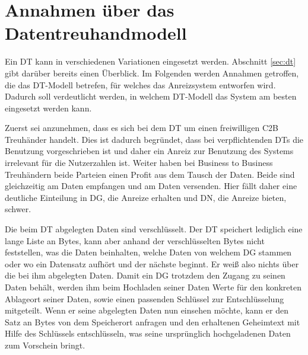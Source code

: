 \documentclass[
	fontsize=11pt,
	headings=small,
	parskip=half,           %
	bibliography=totoc,
	numbers=noenddot,       %
	open=any,               %
]{scrreprt}
\begin{document}
\section{Annahmen über das Datentreuhandmodell}
\label{sec:systemAssumptions}
Ein DT kann in verschiedenen Variationen eingesetzt werden. Abschnitt \ref{sec:dt} gibt darüber bereits einen Überblick. Im Folgenden werden Annahmen getroffen, die das DT-Modell betrefen, für welches das Anreizsystem entworfen wird. Dadurch soll verdeutlicht werden, in welchem DT-Modell das System am besten eingesetzt werden kann.

Zuerst sei anzunehmen, dass es sich bei dem DT um einen freiwilligen C2B Treuhänder handelt. Dies ist dadurch begründet, dass bei verpflichtenden DTs die Benutzung vorgeschrieben ist und daher ein Anreiz zur Benutzung des Systems irrelevant für die Nutzerzahlen ist. Weiter haben bei Business to Business Treuhändern beide Parteien einen Profit aus dem Tausch der Daten. Beide sind gleichzeitig am Daten empfangen und am Daten versenden. Hier fällt daher eine deutliche Einteilung in DG, die Anreize erhalten und DN, die Anreize bieten, schwer. 

Die beim DT abgelegten Daten sind verschlüsselt. Der DT speichert lediglich eine lange Liste an Bytes, kann aber anhand der verschlüsselten Bytes nicht feststellen, was die Daten beinhalten, welche Daten von welchem DG stammen oder wo ein Datensatz aufhört und der nächste beginnt. Er weiß also nichts über die bei ihm abgelegten Daten. Damit ein DG trotzdem den Zugang zu seinen Daten behält, werden ihm beim Hochladen seiner Daten Werte für den konkreten Ablageort seiner Daten, sowie einen passenden Schlüssel zur Entschlüsselung mitgeteilt. Wenn er seine abgelegten Daten nun einsehen möchte, kann er den Satz an Bytes von dem Speicherort anfragen und den erhaltenen Geheimtext mit Hilfe des Schlüssels entschlüsseln, was seine ursprünglich hochgeladenen Daten zum Vorschein bringt.
\end{document}
